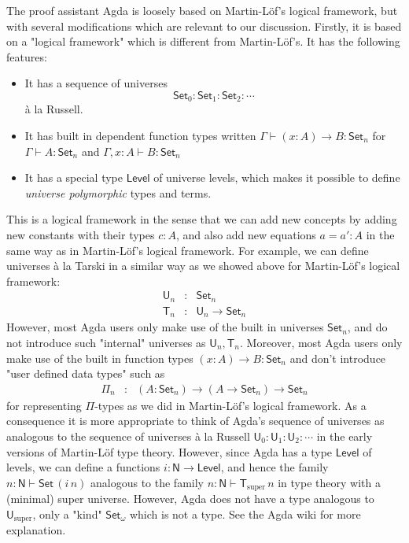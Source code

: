 \documentclass[11pt,a4paper]{article}
\def\UU{\mathsf{U}}
\def\Level{\mathsf{Level}}
\newcommand{\N}{\mathsf{N}}
\newcommand{\Set}{\mathsf{Set}}
\newcommand{\T}{\mathsf{T}}
\newcommand{\Usuper}{\UU_{\mathrm{super}}}
\newcommand{\Tsuper}{\T_{\mathrm{super}}}
\begin{document}
The proof assistant Agda is loosely based on Martin-Löf's logical framework, but with several modifications which are relevant to our discussion. Firstly, it is based on a "logical framework" which is different from Martin-Löf's. It has the following features:
\begin{itemize}
\item It has a sequence of universes  $$\Set_0 : \Set_1 : \Set_2 : \cdots$$  \`a la Russell.
\item It has built in dependent function types written $\Gamma \vdash (x : A)\to B : \Set_n$ for $\Gamma \vdash A : \Set_n$ and $\Gamma , x : A \vdash B : \Set_n$
\item It has a special type $\Level$ of universe levels, which makes it possible to define {\em universe polymorphic} types and terms.
\end{itemize}
This is a logical framework in the sense that we can add new concepts by adding new constants with their types $c : A$, and also add new equations $a = a' : A$ in the same way as in Martin-Löf's logical framework. For example, we can define universes \`a la Tarski in a similar way as we showed above for Martin-Löf's logical framework:
\begin{eqnarray*}
\UU_n &: &\Set_n\\
\T_n &:& \UU_n \to \Set_n
\end{eqnarray*}
However, most Agda users only make use of the built in universes $\Set_n$, and do not introduce such "internal" universes as $\UU_n, \T_n$. Moreover, most Agda users only make use of the built in function types $(x : A)\to B : \Set_n$ and don't introduce "user defined data types" such as
\begin{eqnarray*}
\Pi_n &:& (A:\Set_n) \to (A \to \Set_n) \to \Set_n
\end{eqnarray*}
for representing $\Pi$-types as we did in Martin-Löf's logical framework. As a consequence it is more appropriate to think of Agda's sequence of universes as analogous to the sequence of universes  \`a la Russell $ \UU_0 : \UU_1 : \UU_2 : \cdots$ in the early versions of Martin-Löf type theory. However, since Agda has a type $\Level$ of levels, we can define a functions $i : \N \to \Level$, and hence the family $n : \N \vdash \Set\, (i\, n)$ analogous to the family $n : \N \vdash \Tsuper\,n$ in type theory with a (minimal) super universe. However, Agda does not have a type analogous to $\Usuper$, only a "kind" $\Set_\omega$ which is not a type. See the Agda wiki for more explanation.
\end{document}
